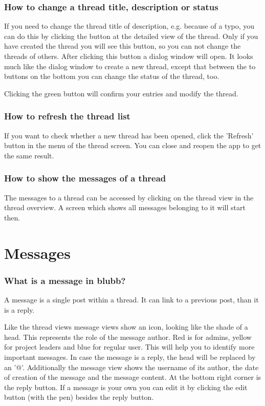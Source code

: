 \documentclass[12pt,a4paper,oneside]{report}
\newcommand{\appname}{blubb}
\begin{document}
\subsubsection{How to change a thread title, description or status}
If you need to change the thread title of description, e.g. because of a typo, you can do this by clicking the button at the detailed view of the thread. Only if you have created the thread you will see this button, so you can not change the threads of others. After clicking this button a dialog window will open. It looks much like the dialog window to create a new thread, except that between the to buttons on the bottom you can change the status of the thread, too. 

Clicking the green button will confirm your entries and modify the thread. 

\subsubsection{How to refresh the thread list}
If you want to check whether a new thread has been opened, click the 'Refresh' button in the menu of the thread screen. You can close and reopen the app to get the same result.

\subsubsection{How to show the messages of a thread}
The messages to a thread can be accessed by clicking on the thread view in the thread overview. A screen which shows all messages belonging to it will start then.

\section{Messages}
\subsubsection{What is a message in \appname{}?}
A message is a single post within a thread. It can link to a previous post, than it is a reply.

Like the thread views message views show an icon, looking like the shade of a head. This represents the role of the message author. Red is for admins, yellow for project leaders and blue for regular user. This will help you to identify more important messages.
In case the message is a reply, the head will be replaced by an '@'.
Additionally the message view shows the username of its author, the date of creation of the message and the message content. At the bottom right corner is the reply button. If a message is your own you can edit it by clicking the edit button (with the pen) besides the reply button.\\
\end{document}

